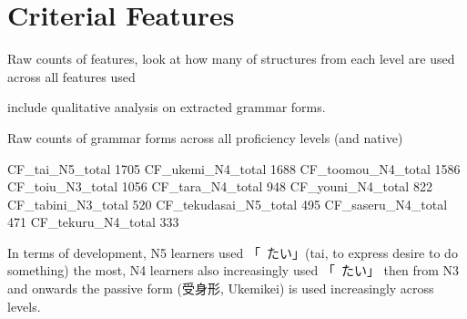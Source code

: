 \section{Criterial Features}
Raw counts of features, 
look at how many of structures from each level are used across all features used

include qualitative analysis on extracted grammar forms.

Raw counts of grammar forms across all proficiency levels (and native)

CF_tai_N5_total          1705
CF_ukemi_N4_total        1688
CF_toomou_N4_total       1586
CF_toiu_N3_total         1056
CF_tara_N4_total          948
CF_youni_N4_total         822
CF_tabini_N3_total        520
CF_tekudasai_N5_total     495
CF_saseru_N4_total        471
CF_tekuru_N4_total        333

In terms of development, N5 learners used 「~たい」(tai, to express desire to do something) the most, N4 learners also
increasingly used 「~たい」 then from N3 and onwards the passive form (受身形, Ukemikei) is used increasingly across
levels.




